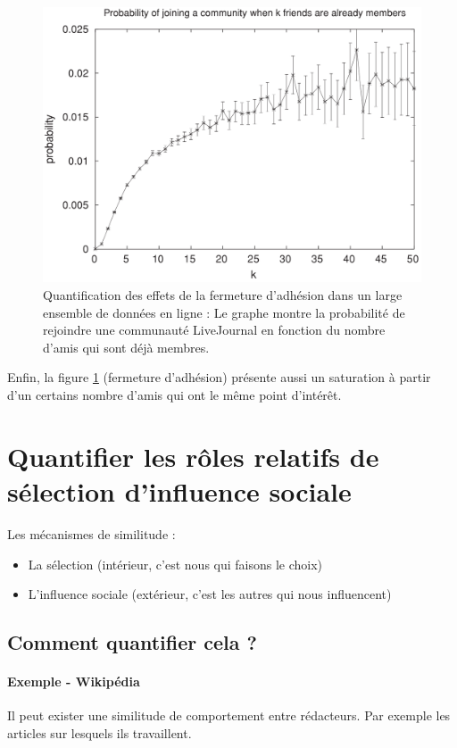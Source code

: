 \begin{figure}[!ht]
    \centering
    \includegraphics[width=\textwidth]{images/21_community.png}
    \caption{Quantification des effets de la fermeture d'adhésion dans
        un large ensemble de données en ligne : Le graphe montre la
        probabilité de rejoindre une communauté LiveJournal en fonction
    du nombre d'amis qui sont déjà membres.}
    \label{community}
\end{figure}

Enfin, la figure \ref{community} (fermeture d'adhésion) présente aussi un saturation à partir d'un certains nombre d'amis qui ont le même point d'intérêt.

\clearpage

\section{Quantifier les rôles relatifs de sélection d'influence sociale}
Les mécanismes de similitude :
\begin{itemize}
\item La sélection (intérieur, c'est nous qui faisons le choix)
\item L'influence sociale (extérieur, c'est les autres qui nous influencent) 
\end{itemize}
\subsection{Comment quantifier cela ?}

\paragraph{Exemple - Wikipédia}
Il peut exister une similitude de comportement entre rédacteurs. Par exemple les articles sur lesquels ils travaillent.

